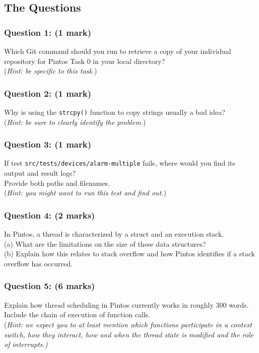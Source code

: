 \documentclass[a4paper,12pt]{article}
\newcommand{\shell}[1]{\lstinline!#1!}
\begin{document}
\subsection*{The Questions}

\subsubsection*{Question 1: (1 mark)} \vspace{-0.1em}
Which Git command should you run to retrieve a copy of your individual repository for Pintos Task 0 in your local directory? \\
(\textit{Hint: be specific to this task.})

\subsubsection*{Question 2: (1 mark)} \vspace{-0.1em}
Why is using the {\tt strcpy()} function to copy strings usually a bad idea? \\
(\textit{Hint: be sure to clearly identify the problem.})

\subsubsection*{Question 3: (1 mark)} \vspace{-0.1em}
If test \shell{src/tests/devices/alarm-multiple} fails, where would you find its output and result logs? \\
Provide both paths and filenames. \\
(\textit{Hint: you might want to run this test and find out.}) 
 
\subsubsection*{Question 4: (2 marks)} \vspace{-0.1em}
In Pintos, a thread is characterized by a struct and an execution stack. \\
(a) What are the limitations on the size of these data structures? \\
(b) Explain how this relates to stack overflow and how Pintos identifies if a stack overflow has occurred.

\subsubsection*{Question 5: (6 marks)} \vspace{-0.1em}
Explain how thread scheduling in Pintos currently works in roughly 300 words. 
Include the chain of execution of function calls. \\
(\textit{Hint: we expect you to at least mention which functions participate in a context switch, how they interact, how and when the thread state is modified and the role of interrupts.)}
\end{document}
